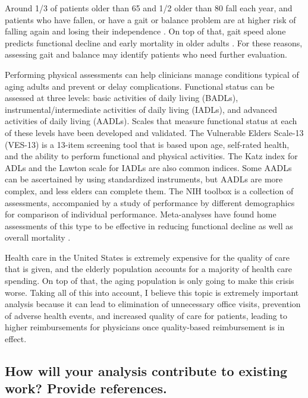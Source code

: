 \documentclass[twoside,11pt]{article}
\begin{document}
  Around 1/3 of patients older than 65 and 1/2 older than 80 fall each year, and patients who have fallen, or have a gait or balance problem are at higher risk of falling again and losing their independence \citep{cite1}. On top of that, gait speed alone predicts functional decline and early mortality in older adults \citep{cite1}. For these reasons, assessing gait and balance may identify patients who need further evaluation.

  Performing physical assessments can help clinicians manage conditions typical of aging adults and prevent or delay complications. Functional status can be assessed at three levels: basic activities of daily living (BADLs), instrumental/intermediate activities of daily living (IADLs), and advanced activities of daily living (AADLs). Scales that measure functional status at each of these levels have been developed and validated. The Vulnerable Elders Scale-13 (VES-13) is a 13-item screening tool that is based upon age, self-rated health, and the ability to perform functional and physical activities. The Katz index for ADLs and the Lawton scale for IADLs are also common indices. Some AADLs can be ascertained by using standardized instruments, but AADLs are more complex, and less elders can complete them. The NIH toolbox is a collection of assessments, accompanied by a study of performance by different demographics for comparison of individual performance. Meta-analyses have found home assessments of this type to be effective in reducing functional decline as well as overall mortality \citep{cite1}. 
  
  Health care in the United States is extremely expensive for the quality of care that is given, and the elderly population accounts for a majority of health care spending. On top of that, the aging population is only going to make this crisis worse. Taking all of this into account, I believe this topic is extremely important analysis because it can lead to elimination of unnecessary office visits, prevention of adverse health events, and increased quality of care for patients, leading to higher reimbursements for physicians once quality-based reimbursement is in effect.


\subsection{How will your analysis contribute to existing work? Provide references.}
\end{document}
